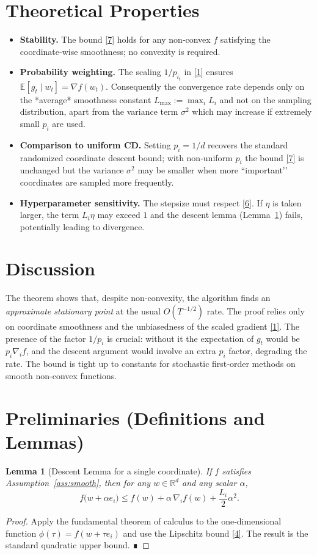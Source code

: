 \documentclass[11pt]{article}
\newtheorem{lemma}{Lemma}
\newcommand{\E}{\mathbb{E}}
\newcommand{\R}{\mathbb{R}}
\begin{document}
\section*{Theoretical Properties}
\begin{itemize}[leftmargin=*]
\item \textbf{Stability.}  The bound \eqref{7} holds for any
non‑convex $f$ satisfying the coordinate‑wise smoothness; no convexity
is required.
\item \textbf{Probability weighting.}  The scaling $1/p_{i_t}$ in \eqref{1}
ensures $\E[g_t\mid w_t]=\nabla f(w_t)$.  Consequently the convergence rate
depends only on the *average* smoothness constant $L_{\max}:=\max_i L_i$
and not on the sampling distribution, apart from the variance term
$\sigma^2$ which may increase if extremely small $p_i$ are used.
\item \textbf{Comparison to uniform CD.}  Setting $p_i=1/d$ recovers the
standard randomized coordinate descent bound; with non‑uniform $p_i$
the bound \eqref{7} is unchanged but the variance $\sigma^2$ may be
smaller when more “important’’ coordinates are sampled more frequently.
\item \textbf{Hyperparameter sensitivity.}  The stepsize must respect
\eqref{6}.  If $\eta$ is taken larger, the term $L_i\eta$ may exceed $1$
and the descent lemma (Lemma~\ref{lem:descent}) fails, potentially leading
to divergence.
\end{itemize}

\section*{Discussion}
The theorem shows that, despite non‑convexity, the algorithm finds an
\emph{approximate stationary point} at the usual $O(T^{-1/2})$ rate.
The proof relies only on coordinate smoothness and the unbiasedness of
the scaled gradient \eqref{1}.  The presence of the factor $1/p_i$ is
crucial: without it the expectation of $g_t$ would be $p_i\nabla_i f$, and
the descent argument would involve an extra $p_i$ factor, degrading the
rate.  The bound is tight up to constants for stochastic first‑order
methods on smooth non‑convex functions.

\newpage

\section*{Preliminaries (Definitions and Lemmas)}
\begin{lemma}[Descent Lemma for a single coordinate]\label{lem:descent}
If $f$ satisfies Assumption~\ref{ass:smooth}, then for any $w\in\R^{d}$
and any scalar $\alpha$,
\[
f\bigl(w+\alpha e_i\bigr)
\le f(w)+\alpha\,\nabla_i f(w)+\frac{L_i}{2}\alpha^{2}.
\tag{8}
\]
\end{lemma}
\begin{proof}
Apply the fundamental theorem of calculus to the one‑dimensional
function $\phi(\tau)=f(w+\tau e_i)$ and use the Lipschitz bound
\eqref{4}.  The result is the standard quadratic upper bound.  ∎
\end{proof}
\end{document}
